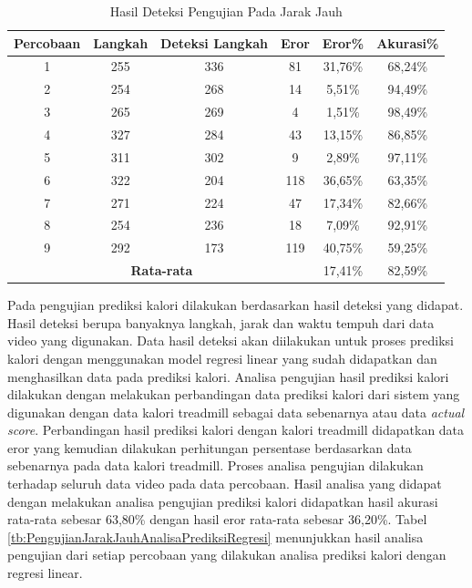 \begin{longtable}{|c|c|c|c|c|c|}
  \caption{Hasil Deteksi Pengujian Pada Jarak Jauh}
  \label{tb:PengujianJarakJauhAnalisaDeteksi}                                   \\
  \hline
  \rowcolor[HTML]{C0C0C0}
  \textbf{Percobaan} & \textbf{Langkah} & \textbf{Deteksi Langkah} & \textbf{Eror} & \textbf{Eror\%} & \textbf{Akurasi\%} \\
  \hline
  1   & 255   & 336 & 81   & 31,76\%    & 68,24\%   \\
  \hline
  2   & 254   & 268 & 14   & 5,51\%     & 94,49\%   \\
  \hline
  3   & 265   & 269 & 4    & 1,51\%     & 98,49\%     \\
  \hline
  4   & 327   & 284 & 43   & 13,15\%    & 86,85\%   \\
  \hline
  5   & 311   & 302 & 9    & 2,89\%     & 97,11\%   \\
  \hline
  6   & 322   & 204 & 118  & 36,65\%    & 63,35\%   \\
  \hline
  7   & 271   & 224 & 47   & 17,34\%    & 82,66\%   \\
  \hline
  8   & 254   & 236 & 18   & 7,09\%     & 92,91\%   \\
  \hline
  9   & 292   & 173 & 119  & 40,75\%   & 59,25\%   \\
  \hline

  \multicolumn{4}{|c|}{\textbf{Rata-rata}} & 17,41\% & 82,59\% \\
  \hline
\end{longtable}

Pada pengujian prediksi kalori dilakukan berdasarkan hasil deteksi yang didapat. Hasil deteksi berupa banyaknya langkah, jarak dan waktu tempuh dari data video yang digunakan. Data hasil deteksi akan diilakukan untuk proses prediksi kalori dengan menggunakan model regresi linear yang sudah didapatkan dan menghasilkan data pada prediksi kalori. Analisa pengujian hasil prediksi kalori dilakukan dengan melakukan perbandingan data prediksi kalori dari sistem yang digunakan dengan data kalori treadmill sebagai data sebenarnya atau data \emph{actual score}. Perbandingan hasil prediksi kalori dengan kalori treadmill didapatkan data eror yang kemudian dilakukan perhitungan persentase berdasarkan data sebenarnya pada data kalori treadmill. Proses analisa pengujian dilakukan terhadap seluruh data video pada data percobaan. Hasil analisa yang didapat dengan melakukan analisa pengujian prediksi kalori didapatkan hasil akurasi rata-rata sebesar 63,80\% dengan hasil eror rata-rata sebesar 36,20\%. Tabel \ref{tb:PengujianJarakJauhAnalisaPrediksiRegresi} menunjukkan hasil analisa pengujian dari setiap percobaan yang dilakukan analisa prediksi kalori dengan regresi linear.

